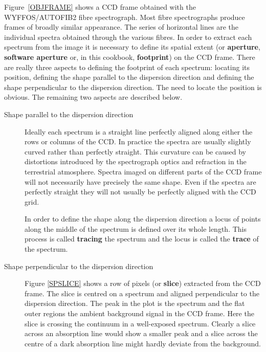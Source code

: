 \documentclass[chapters,twoside,11pt]{starlink}
\begin{document}
Figure~\ref{OBJFRAME} shows a CCD frame obtained with the WYFFOS/AUTOFIB2
fibre spectrograph.  Most fibre spectrographs produce frames of broadly
similar appearance.  The series of horizontal lines are the individual
spectra obtained through the various fibres.  In order to extract each
spectrum from the image it is necessary to define its spatial extent (or
\textbf{aperture}, \textbf{software aperture} or, in this cookbook, \textbf{footprint}) on the CCD frame.  There are really three aspects to defining
the footprint of each spectrum: locating its position, defining the shape
parallel to the dispersion direction and defining the shape perpendicular
to the dispersion direction.  The need to locate the position is obvious.
The remaining two aspects are described below.

\begin{description}

  \item[Shape parallel to the dispersion direction] Ideally each
   spectrum is a straight line perfectly aligned along either the
   rows or columns of the CCD.  In practice the spectra are usually
   slightly curved rather than perfectly straight.  This curvature can
   be caused by distortions introduced by the spectrograph optics and
   refraction in the terrestrial atmosphere.  Spectra imaged on
   different parts of the CCD frame will not necessarily have precisely
   the same shape.  Even if the spectra are perfectly straight they
   will not usually be perfectly aligned with the CCD grid.

   In order to define the shape along the dispersion direction a locus
   of points along the middle of the spectrum is defined over its whole
   length.  This process is called \textbf{tracing} the spectrum and the
   locus is called the \textbf{trace} of the spectrum.

  \item[Shape perpendicular to the dispersion direction] Figure
   \ref{SPSLICE} shows a row of pixels (or \textbf{slice}) extracted from
   the CCD frame.  The slice is centred on a spectrum and aligned
   perpendicular to the dispersion direction.  The peak in the plot is
   the spectrum and the flat outer regions the ambient background signal
   in the CCD frame.  Here the slice is crossing the continuum in a
   well-exposed spectrum.  Clearly a slice across an absorption line
   would show a smaller peak and a slice across the centre of a dark
   absorption line might hardly deviate from the background.


\end{description}
\end{document}
